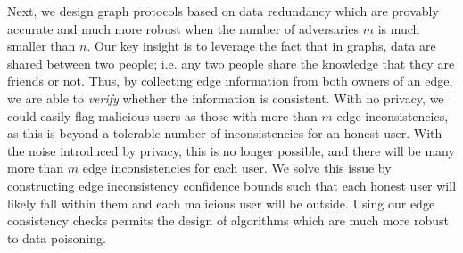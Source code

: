\begin{comment}\noindent\textbf{Note.} Allour results are attack-agnostic, i.e.,
We reiterate that our correctness and soundness definitions take strict approaches as to what constitutes an ``abnormal'' execution and thus when a protocol is allowed to return $\bottom$. Under correctness, all honest users receive an accurate estimate, regardless of any data poisoning attack. Under soundness, only malicious users who may poison their data are allowed to receive $\bottom$. 

For both correctness and soundness, error terms of $m$ are generally possible against any protocol, as if $m$ users act maliciously, they can corrupt the information of $m$ edges to any user. As described in Section~\ref{chap4-sec:price-privacy}, even non-private protocols are susceptible to such attacks. Thus, our correctness and soundness guarantees will all contain terms of $m$---since $m$ is generally small, this term is the lowest-order term in our bounds.

Finally, our definitions are attack-agnostic: an algorithm which is correct or sound up to $m$ malicious users must satisfy the claims regardless of the attack used.
\end{comment}



Next, we design graph protocols based on data redundancy which are provably accurate and much more robust when the number of adversaries $m$ is much smaller than $n$. Our key insight is to leverage the fact that in graphs, data are shared between two people; i.e. any two people share the knowledge that they are friends or not. Thus, by collecting edge information from both owners of an edge, we are able to \emph{verify} whether the information is consistent. With no privacy, we could easily flag malicious users as those with more than $m$ edge inconsistencies, as this is beyond a tolerable number of inconsistencies for an honest user. With the noise introduced by privacy, this is no longer possible, and there will be many more than $m$ edge inconsistencies for each user. We solve this issue by constructing edge inconsistency confidence bounds such that each honest user will likely fall within them and each malicious user will be outside. Using our edge consistency checks permits the design of algorithms which are much more robust to data poisoning.


